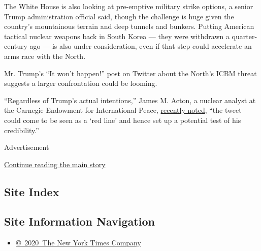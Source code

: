 The White House is also looking at pre-emptive military strike options,
a senior Trump administration official said, though the challenge is
huge given the country's mountainous terrain and deep tunnels and
bunkers. Putting American tactical nuclear weapons back in South Korea
--- they were withdrawn a quarter-century ago --- is also under
consideration, even if that step could accelerate an arms race with the
North.

Mr. Trump's ``It won't happen!'' post on Twitter about the North's ICBM
threat suggests a larger confrontation could be looming.

``Regardless of Trump's actual intentions,'' James M. Acton, a nuclear
analyst at the Carnegie Endowment for International Peace,
\href{https://www.theatlantic.com/international/archive/2017/01/trump-twitter-north-korea/512450/}{recently
noted}, ``the tweet could come to be seen as a `red line' and hence set
up a potential test of his credibility.''

Advertisement

\protect\hyperlink{after-bottom}{Continue reading the main story}

\hypertarget{site-index}{%
\subsection{Site Index}\label{site-index}}

\hypertarget{site-information-navigation}{%
\subsection{Site Information
Navigation}\label{site-information-navigation}}

\begin{itemize}
\tightlist
\item
  \href{https://help.nytimes3xbfgragh.onion/hc/en-us/articles/115014792127-Copyright-notice}{©~2020~The
  New York Times Company}
\end{itemize}

